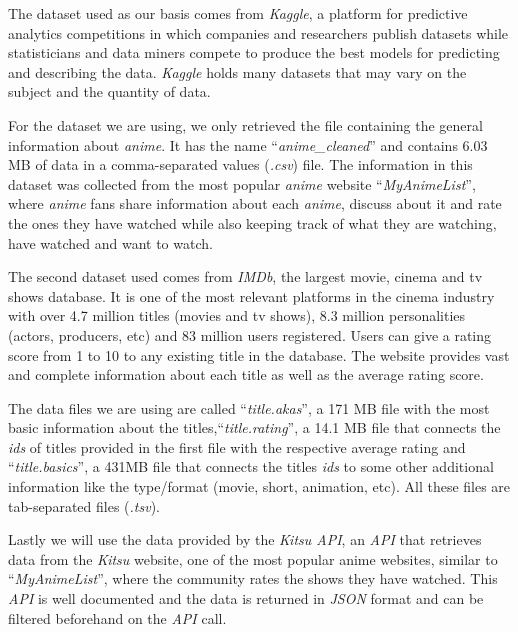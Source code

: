 \documentclass[twocolumn,twoside,11pt,a4paper]{article}
\begin{document}
The dataset used as our basis comes from \textit{Kaggle}, a platform for predictive analytics competitions in which companies and researchers publish datasets while statisticians and data miners compete to produce the best models for predicting and describing the data. \textit{Kaggle} holds many datasets that may vary on the subject and the quantity of data.
\par
For the dataset we are using, we only retrieved the file containing the general information about \textit{anime}. It has the name “\textit{anime\_cleaned}” and contains 6.03 MB of data in a comma-separated values (\textit{.csv}) file. The information in this dataset was collected from the most popular \textit{anime} website “\textit{MyAnimeList}”, where \textit{anime} fans share information about each \textit{anime}, discuss about it and rate the ones they have watched while also keeping track of what they are watching, have watched and want to watch.
\par
The second dataset used comes from \textit{IMDb}, the largest movie, cinema and tv shows database. It is one of the most relevant platforms in the cinema industry with over 4.7 million titles (movies and tv shows), 8.3 million personalities (actors, producers, etc) and 83 million users registered. Users can give a rating score from 1 to 10 to any existing title in the database. The website provides vast and complete information about each title as well as the average rating score. 
\par
The data files we are using are called “\textit{title.akas}”, a 171 MB file with the most basic information about the titles,“\textit{title.rating}”, a 14.1 MB file that connects the \textit{ids} of titles provided in the first file with the respective average rating and “\textit{title.basics}”, a 431MB file that connects the titles \textit{ids} to some other additional information like the type/format (movie, short, animation, etc). All these files are tab-separated files (\textit{.tsv}).
\par
Lastly we will use the data provided by the \textit{Kitsu API}, an \textit{API} that retrieves data from the \textit{Kitsu} website, one of the most popular anime websites, similar to “\textit{MyAnimeList}”, where the community rates the shows they have watched. This \textit{API} is well documented and the data is returned in \textit{JSON} format and can be filtered beforehand on the \textit{API} call.

\end{document}
